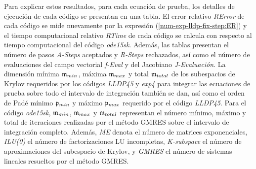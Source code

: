 Para explicar estos resultados, para cada ecuación de prueba, los detalles de ejecución de cada código se presentan en una tabla. El error relativo \textit{RError} de cada código se mide nuevamente por la expresión (\ref{num-exp-lldp-fix-step:ER}) y el tiempo computacional relativo \textit{RTime} de cada código se calcula con respecto al tiempo computacional del código \emph{ode15sk}. Además, las tablas presentan el número de pasos \textit{A-Steps} aceptados y \textit{R-Steps} rechazados, así como el número de evaluaciones del campo vectorial \textit{f-Eval} y del Jacobiano \textit{J-Evaluación}. La dimensión mínima $\mathfrak{m}_ {min}$, máxima $\mathfrak{m}_ {max}$ y total $\mathfrak{m}_{total}$ de los subespacios de Krylov requeridos por los códigos \emph{LLDP45} y \emph{exp4} para integrar las ecuaciones de prueba sobre todo el intervalo de integración  también se dan, así como el orden de Padé mínimo $\mathfrak{p}_{min}$ y máximo $\mathfrak{p}_{max}$ requerido por el código \emph{LLDP45}. Para el código \emph{ode15sk}, $\mathfrak{m}_{min}$, $\mathfrak{m}_{max}$ y $\mathfrak{m}_{total}$ representan el número mínimo, máximo y total de iteraciones realizadas por el método GMRES sobre el intervalo de integración completo. Además, \textit{ME} denota el número de matrices exponenciales, \textit{ILU(0)} el número de factorizaciones LU incompletas, \textit{K-subspace} el número de aproximaciones del subespacio de Krylov, y \textit{GMRES} el número de sistemas lineales resueltos por el método GMRES.

